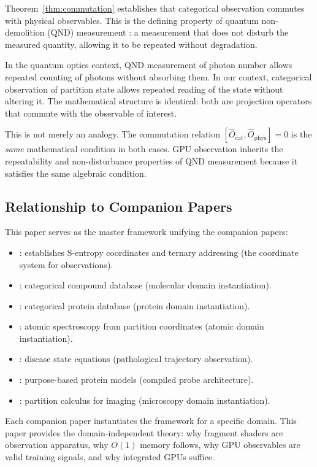 \documentclass[11pt,twocolumn,a4paper]{article}
\theoremstyle{definition}
\theoremstyle{remark}
\newcommand{\Ocat}{\hat{O}_{\mathrm{cat}}}
\newcommand{\Ophys}{\hat{O}_{\mathrm{phys}}}
\begin{document}
Theorem~\ref{thm:commutation} establishes that categorical observation commutes with physical observables. This is the defining property of quantum non-demolition (QND) measurement \citep{braginsky1992}: a measurement that does not disturb the measured quantity, allowing it to be repeated without degradation.

In the quantum optics context, QND measurement of photon number allows repeated counting of photons without absorbing them. In our context, categorical observation of partition state allows repeated reading of the state without altering it. The mathematical structure is identical: both are projection operators that commute with the observable of interest.

This is not merely an analogy. The commutation relation $[\Ocat, \Ophys] = 0$ is the \emph{same} mathematical condition in both cases. GPU observation inherits the repeatability and non-disturbance properties of QND measurement because it satisfies the same algebraic condition.

\subsection{Relationship to Companion Papers}

This paper serves as the master framework unifying the companion papers:
\begin{itemize}[nosep]
\item \citet{sachikonye2025a}: establishes S-entropy coordinates and ternary addressing (the coordinate system for observations).
\item \citet{sachikonye2025b}: categorical compound database (molecular domain instantiation).
\item \citet{sachikonye2025c}: categorical protein database (protein domain instantiation).
\item \citet{sachikonye2025d}: atomic spectroscopy from partition coordinates (atomic domain instantiation).
\item \citet{sachikonye2025e}: disease state equations (pathological trajectory observation).
\item \citet{sachikonye2025f}: purpose-based protein models (compiled probe architecture).
\item \citet{sachikonye2025_partition}: partition calculus for imaging (microscopy domain instantiation).
\end{itemize}

Each companion paper instantiates the framework for a specific domain. This paper provides the domain-independent theory: why fragment shaders are observation apparatus, why $O(1)$ memory follows, why GPU observables are valid training signals, and why integrated GPUs suffice.
\end{document}
